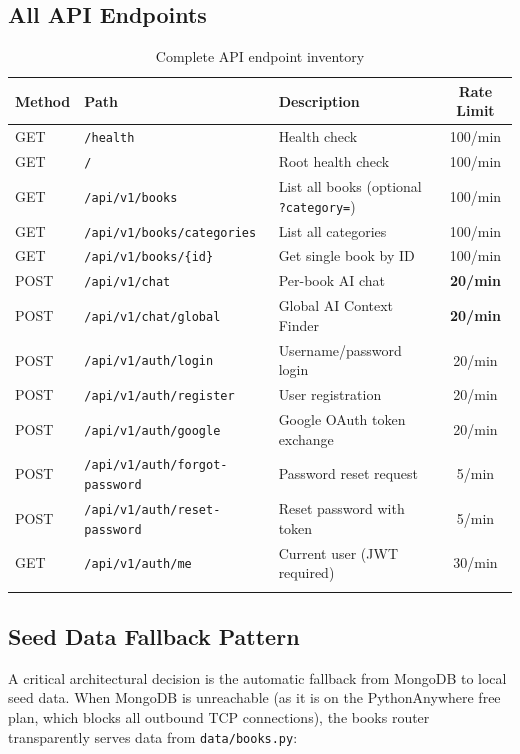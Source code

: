 \documentclass[11pt,a4paper]{article}
\begin{document}
\subsection{All API Endpoints}

\begin{longtable}{@{}lllc@{}}
\toprule
\textbf{Method} & \textbf{Path} & \textbf{Description} & \textbf{Rate Limit} \\
\midrule
\endhead
GET & \texttt{/health} & Health check & 100/min \\
GET & \texttt{/} & Root health check & 100/min \\
GET & \texttt{/api/v1/books} & List all books (optional \texttt{?category=}) & 100/min \\
GET & \texttt{/api/v1/books/categories} & List all categories & 100/min \\
GET & \texttt{/api/v1/books/\{id\}} & Get single book by ID & 100/min \\
POST & \texttt{/api/v1/chat} & Per-book AI chat & \textbf{20/min} \\
POST & \texttt{/api/v1/chat/global} & Global AI Context Finder & \textbf{20/min} \\
POST & \texttt{/api/v1/auth/login} & Username/password login & 20/min \\
POST & \texttt{/api/v1/auth/register} & User registration & 20/min \\
POST & \texttt{/api/v1/auth/google} & Google OAuth token exchange & 20/min \\
POST & \texttt{/api/v1/auth/forgot-password} & Password reset request & 5/min \\
POST & \texttt{/api/v1/auth/reset-password} & Reset password with token & 5/min \\
GET & \texttt{/api/v1/auth/me} & Current user (JWT required) & 30/min \\
\bottomrule
\caption{Complete API endpoint inventory}
\end{longtable}

\subsection{Seed Data Fallback Pattern}

A critical architectural decision is the automatic fallback from MongoDB to local seed data. When MongoDB is unreachable (as it is on the PythonAnywhere free plan, which blocks all outbound TCP connections), the books router transparently serves data from \texttt{data/books.py}:
\end{document}
